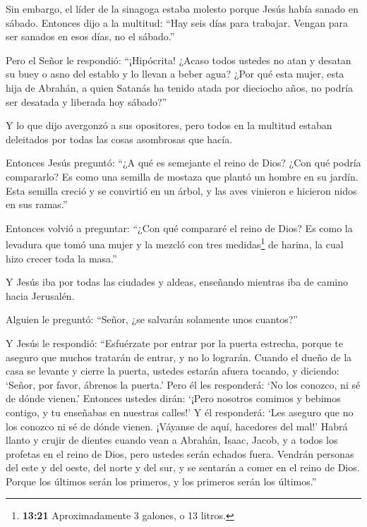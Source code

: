  Sin embargo, el líder de la sinagoga estaba molesto porque
Jesús había sanado en sábado. Entonces dijo a la multitud: ``Hay seis
días para trabajar. Vengan para ser sanados en esos días, no el
sábado.''

 Pero el Señor le respondió: ``¡Hipócrita! ¿Acaso todos
ustedes no atan y desatan su buey o asno del establo y lo llevan a beber
agua?  ¿Por qué esta mujer, esta hija de Abrahán, a quien
Satanás ha tenido atada por dieciocho años, no podría ser desatada y
liberada hoy sábado?''

 Y lo que dijo avergonzó a sus opositores, pero todos en la
multitud estaban deleitados por todas las cosas asombrosas que hacía.

 Entonces Jesús preguntó: ``¿A qué es semejante el reino de
Dios? ¿Con qué podría compararlo?  Es como una semilla de
mostaza que plantó un hombre en su jardín. Esta semilla creció y se
convirtió en un árbol, y las aves vinieron e hicieron nidos en sus
ramas.''

 Entonces volvió a preguntar: ``¿Con qué compararé el reino
de Dios?  Es como la levadura que tomó una mujer y la
mezcló con tres medidas\footnote{\textbf{13:21} Aproximadamente 3
  galones, o 13 litros.} de harina, la cual hizo crecer toda la masa.''

 Y Jesús iba por todas las ciudades y aldeas, enseñando
mientras iba de camino hacia Jerusalén.

 Alguien le preguntó: ``Señor, ¿se salvarán solamente unos
cuantos?''

Y Jesús le respondió:  ``Esfuérzate por entrar por la
puerta estrecha, porque te aseguro que muchos tratarán de entrar, y no
lo lograrán.  Cuando el dueño de la casa se levante y
cierre la puerta, ustedes estarán afuera tocando, y diciendo: `Señor,
por favor, ábrenos la puerta.' Pero él les responderá: `No los conozco,
ni sé de dónde vienen.'  Entonces ustedes dirán: `¡Pero
nosotros comimos y bebimos contigo, y tu enseñabas en nuestras calles!'
 Y él responderá: `Les aseguro que no los conozco ni sé de
dónde vienen. ¡Váyanse de aquí, hacedores del mal!'  Habrá
llanto y crujir de dientes cuando vean a Abrahán, Isaac, Jacob, y a
todos los profetas en el reino de Dios, pero ustedes serán echados
fuera.  Vendrán personas del este y del oeste, del norte y
del sur, y se sentarán a comer en el reino de Dios.  Porque
los últimos serán los primeros, y los primeros serán los últimos.''

